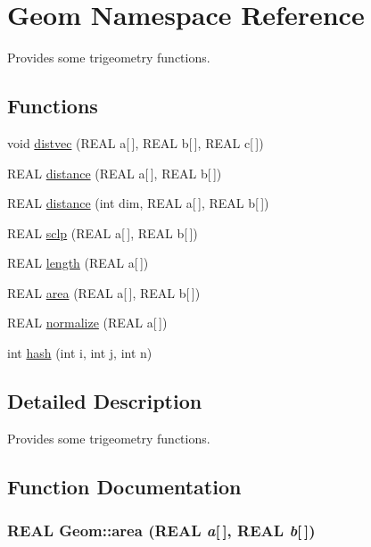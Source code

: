 \hypertarget{namespaceGeom}{
\section{Geom Namespace Reference}
\label{namespaceGeom}
}
Provides some trigeometry functions.  


\subsection*{Functions}
\begin{CompactItemize}
\item 
void \hyperlink{namespaceGeom_6bbaf6733aab04a39e7af8e251cd86e0}{distvec} (REAL a\mbox{[}$\,$\mbox{]}, REAL b\mbox{[}$\,$\mbox{]}, REAL c\mbox{[}$\,$\mbox{]})
\item 
REAL \hyperlink{namespaceGeom_8ffc25d21d218413f26b8633aa5d892c}{distance} (REAL a\mbox{[}$\,$\mbox{]}, REAL b\mbox{[}$\,$\mbox{]})
\item 
REAL \hyperlink{namespaceGeom_1277bdb3dcb8cc8ccd5328d003ee7355}{distance} (int dim, REAL a\mbox{[}$\,$\mbox{]}, REAL b\mbox{[}$\,$\mbox{]})
\item 
REAL \hyperlink{namespaceGeom_cdec0165d0e6b19e6273d02d902589b5}{sclp} (REAL a\mbox{[}$\,$\mbox{]}, REAL b\mbox{[}$\,$\mbox{]})
\item 
REAL \hyperlink{namespaceGeom_418650983a2439f6f782c77539a43fe1}{length} (REAL a\mbox{[}$\,$\mbox{]})
\item 
REAL \hyperlink{namespaceGeom_4a1d7b458468c1e402cfeb3e2314f6a2}{area} (REAL a\mbox{[}$\,$\mbox{]}, REAL b\mbox{[}$\,$\mbox{]})
\item 
REAL \hyperlink{namespaceGeom_ee55a64ec95ad491647143eb3e788da6}{normalize} (REAL a\mbox{[}$\,$\mbox{]})
\item 
int \hyperlink{namespaceGeom_404fb266d9c4a55df9844e29cd64e949}{hash} (int i, int j, int n)
\end{CompactItemize}


\subsection{Detailed Description}
Provides some trigeometry functions. 



\subsection{Function Documentation}
\hypertarget{namespaceGeom_4a1d7b458468c1e402cfeb3e2314f6a2}{
\subsubsection[{area}]{\setlength{\rightskip}{0pt plus 5cm}REAL Geom::area (REAL {\em a}\mbox{[}$\,$\mbox{]}, \/  REAL {\em b}\mbox{[}$\,$\mbox{]})}}
\label{namespaceGeom_4a1d7b458468c1e402cfeb3e2314f6a2}




